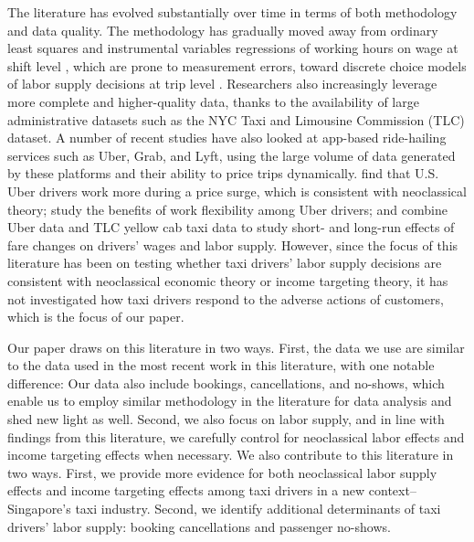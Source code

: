 \documentclass[reviewmode]{restud}
\begin{document}
The literature has evolved substantially over time  in terms of both methodology and data quality. The methodology has gradually moved away from ordinary least squares and instrumental variables regressions of working hours on wage  at shift level \citep{camerer1997labor}, which are prone to measurement errors, toward discrete choice models of labor supply decisions at trip level \citep{farber2005tomorrow,farber2015you,crawford2011new,martin2017quit}. Researchers also increasingly leverage more complete and higher-quality data, thanks to the availability of large administrative datasets such as the NYC Taxi and Limousine Commission (TLC) dataset. A number of recent studies have also looked at app-based ride-hailing services such as Uber, Grab, and Lyft, using the large volume of data generated by these platforms and their ability to price trips dynamically. \citet{chen2015dynamic} find that U.S. Uber drivers work more during a price surge, which is consistent with neoclassical theory; \citet{chen2017value} study the benefits of work flexibility among Uber drivers; and \citet{hall2017labor} combine Uber data and TLC yellow cab taxi data to study short- and long-run effects of fare changes on drivers' wages and labor supply. However, since the focus of this literature has been on testing whether taxi drivers' labor supply decisions are consistent with neoclassical economic theory or income targeting theory, it has not investigated how taxi drivers respond to the adverse actions of customers, which is the focus of our paper.

Our paper draws on this literature in two ways. First, the data we use are similar to the data used in the most recent work in this literature, with one notable difference: Our data also include bookings, cancellations, and no-shows, which enable us to employ similar methodology in the literature for data analysis and shed new light as well. Second, we also focus on labor supply, and in line with findings from this literature, we carefully control for neoclassical labor effects and income targeting effects when necessary. We also contribute to this literature in two ways. First, we provide more evidence for both neoclassical labor supply effects and income targeting effects among taxi drivers in a new context--Singapore's taxi industry. Second, we identify  additional determinants of taxi drivers' labor supply: booking cancellations and passenger no-shows.

\end{document}
